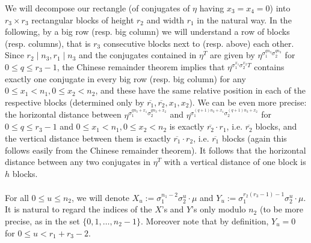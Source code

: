 \documentclass[12pt,a4paper]{article}
\theoremstyle{definition}
\newcommand{\uo}{\overline{r_2}}
\newcommand{\vo}{\overline{r_1}}
\begin{document}
We will decompose our rectangle (of conjugates of $\eta$ having $x_3=x_4=0$) into $r_3\times r_3$ rectangular blocks of height $r_2$ and width $r_1$ in the natural way. In the following, by a big row (resp. big column) we will understand a row of blocks (resp. columns), that is $r_3$ consecutive blocks next to (resp. above) each other. Since $r_2\mid n_3, r_1\mid n_3$ and the conjugates contained in $\eta^T$ are given by $\eta^{\sigma_1^{qn_3}\sigma_2^{qn_3}}$ for $0\leq q \leq r_3-1$, the Chinese remainder theorem implies that $\eta^{\sigma_1^{x_1}\sigma_2^{x_2}T}$ contains exactly one conjugate in every big row (resp. big column) for any $0\leq x_1< n_1, 0\leq x_2< n_2$, and these have the same relative position in each of the respective blocks (determined only by $\vo,\uo,x_1,x_2$). We can be even more precise: the horizontal distance between $\eta^{\sigma_1^{qn_3+x_1}\sigma_2^{qn_3+x_2}}$ and $\eta^ {\sigma_1^{(q+1)n_3+x_1}\sigma_2^{(q+1)n_3+x_2}}$ for $0\leq q \leq r_3-1$ and $0\leq x_1< n_1, 0\leq x_2< n_2$ is exactly $\uo\cdot r_1$, i.e. $\uo$ blocks, and the vertical distance between them is exactly $\vo\cdot r_2$, i.e. $\vo$ blocks (again this follows easily from the Chinese remainder theorem). It follows that the horizontal distance between any two conjugates in $\eta^T$ with a vertical distance of one block is $h$ blocks.

\paragraph*{}
For all $0\leq u\leq n_2$, we will denote $X_u:=\sigma_1^{n_1-2}\sigma_2^{u}\cdot \mu$ and $Y_u:=\sigma_1^{r_2(r_3-1)-1}\sigma_2^u\cdot \mu$. It is natural to regard the indices of the $X$'s and $Y$'s only modulo $n_2$ (to be more precise, as in the set $\{0,1,\dots,n_2-1\}$. Moreover note that by definition, $Y_u=0$ for $0\leq u< r_1+r_3-2$. 
\end{document}
